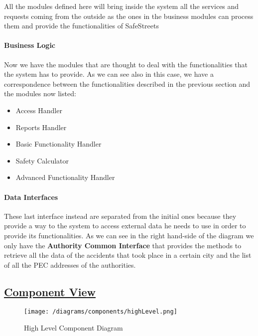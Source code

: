 			All the modules defined here will bring inside the system all the services and requests coming from the outside as the ones in the business modules can process them and provide the functionalities of SafeStreets
			
			\paragraph{Business Logic} Now we have the modules that are thought to deal with the functionalities that the system has to provide. As we can see also in this case, we have a correspondence between the functionalities described in the previous section and the modules now listed:
			
			\begin{itemize}
				\item Access Handler
				\item Reports Handler
				\item Basic Functionality Handler
				\item Safety Calculator
				\item Advanced Functionality Handler
			\end{itemize}
		
			\paragraph{Data Interfaces} These last interface instead are separated from the initial ones because they provide a way to the system to access external data he needs to use in order to provide its functionalities. As we can see in the right hand-side of the diagram we only have the \textbf{Authority Common Interface} that provides the methods to retrieve all the data of the accidents that took place in a certain city and the list of all the PEC addresses of the authorities.
			
			\newpage
		
	\subsection[Component View]{\hyperlink{toc}{Component View}}
		\label{sec:componentView}
		
		\begin{figure}[ht]
			\centering
			\texttt{[image: /diagrams/components/highLevel.png]}
			\caption{\label{fig:highLevelComp} High Level Component Diagram}
		\end{figure}
	
